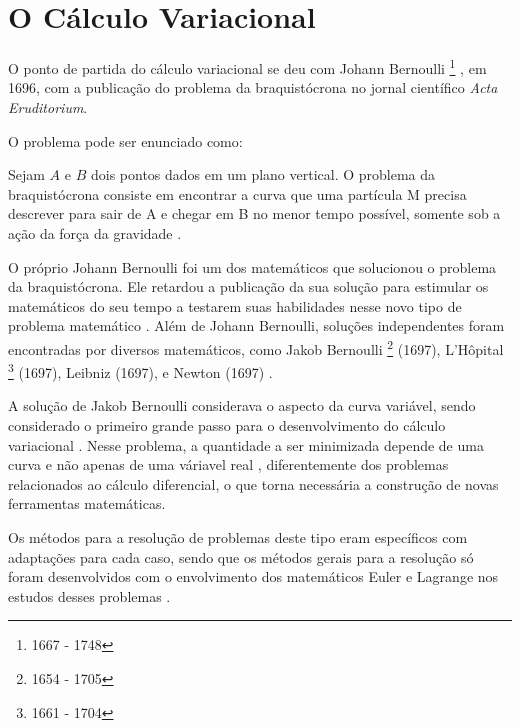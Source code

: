 \documentclass[
	12pt,				%
	openright,			%
    twoside,			%
	a4paper,			%
	english,			%
	french,				%
	spanish,			%
	brazil				%
	]{abntex2}
\numberwithin{lema}{chapter}
\numberwithin{teorema}{chapter}
\numberwithin{definicao}{chapter}
\numberwithin{exemplo}{chapter}
\numberwithin{figure}{chapter}
\newcommand{\bdDate}[2]{
	\footnote{\gtrsymBorn\text{ }#1 - \gtrsymDied\text{ }#2}
}
\begin{document}

\section{O Cálculo Variacional}


O ponto de partida do cálculo variacional se deu com Johann Bernoulli\bdDate{1667}{1748}, em 1696, com a publicação do problema da braquistócrona no jornal científico \textit{Acta Eruditorium}. \cite{hist_courant}

O problema pode ser enunciado como:
\begin{citacao}
Sejam $A$ e $B$ dois pontos dados em um plano vertical. O problema da braquistócrona consiste em encontrar a curva que uma partícula M precisa descrever para sair de A e chegar em B no menor tempo possível, somente sob a ação da força da gravidade \cite[p. 3]{calcvar}.
\end{citacao}

O próprio Johann Bernoulli foi um dos matemáticos que solucionou o problema da braquistócrona. Ele retardou a publicação da sua solução para estimular os matemáticos do seu tempo a testarem suas habilidades nesse novo tipo de problema matemático \cite{hist_courant}. Além de Johann Bernoulli, soluções independentes foram encontradas por diversos matemáticos, como Jakob Bernoulli\bdDate{1654}{1705} (1697), L'Hôpital\bdDate{1661}{1704} (1697), Leibniz (1697), e Newton (1697) \cite{hist_still}.

A solução de Jakob Bernoulli considerava o aspecto da curva variável, sendo considerado o primeiro grande passo para o desenvolvimento do cálculo variacional \cite{hist_still}. Nesse problema, a quantidade a ser minimizada depende de uma curva e não apenas de uma váriavel real \cite{hist_courant}, diferentemente dos problemas relacionados ao cálculo diferencial, o que torna necessária a construção de novas ferramentas matemáticas. 

Os métodos para a resolução de problemas deste tipo eram específicos com adaptações para cada caso, sendo que os métodos gerais para a resolução só foram desenvolvidos com o envolvimento dos matemáticos Euler e Lagrange nos estudos desses problemas \cite{hist_courant}.
\end{document}

